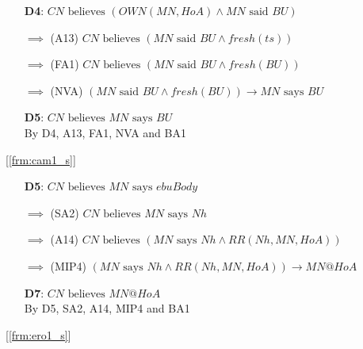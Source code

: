 \documentclass[10pt]{beamer}
\newcommand{\xtext}[1]{\text{ #1 }}
\begin{document}
\begin{frame}[standout]
\end{frame}
\begin{frame}
	\label{frm:cam1_f}
	\begin{itemize}
		\item [] \textbf{D4}: $CN \xtext{believes} (OWN(MN,HoA) \land MN \xtext{said} BU)$
		\item [$\implies$] (A13) $CN \xtext{believes} (MN \xtext{said} BU \land fresh(ts))$
		\item [$\implies$] (FA1) $CN \xtext{believes} (MN \xtext{said} BU \land fresh(BU))$
		\item [$\implies$] (NVA) $(MN \xtext{said} BU \land fresh(BU)) \rightarrow MN \xtext{says} BU$
		\item [] \textbf{D5}: $CN \xtext{believes} MN \xtext{says} BU$ \\ \hspace{1.7cm} By D4, A13, FA1, NVA and BA1
	\end{itemize}
	[\underline{\ref{frm:cam1_s}}]
\end{frame}
\begin{frame}
	\label{frm:ero1_f}
	\begin{itemize}
		\item [] \textbf{D5}: $CN \xtext{believes} MN \xtext{says} ebuBody$
		\item [$\implies$] (SA2) $CN \xtext{believes} MN \xtext{says} Nh$
		\item [$\implies$] (A14) $CN \xtext{believes} (MN \xtext{says} Nh \land RR(Nh,MN,HoA))$
		\item [$\implies$] (MIP4) $(MN \xtext{says} Nh \land RR(Nh,MN,HoA))\rightarrow MN@HoA$
		\item [] \textbf{D7}: $CN \xtext{believes} MN@HoA$ \\ \hspace{1.7cm} By D5, SA2, A14, MIP4 and BA1
	\end{itemize}
	[\underline{\ref{frm:ero1_s}}]
\end{frame}
\end{document}
